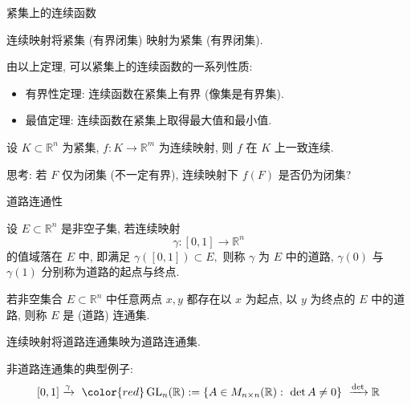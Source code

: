 \begin{frame}{紧集上的连续函数}

\begin{thm}
连续映射将紧集 (有界闭集) 映射为紧集 (有界闭集).
\end{thm}

\pause
\vspace{0.5em}

由以上定理, 可以紧集上的连续函数的一系列性质:
\begin{itemize}
\item 有界性定理: 连续函数在紧集上有界 (像集是有界集).
\item 最值定理: 连续函数在紧集上取得最大值和最小值.
\end{itemize}

\pause
\vspace{1.5em}

\begin{thm}
设 $K \subset \mathbb{R}^n$ 为紧集, $f: K \to \mathbb{R}^m$ 为连续映射, 则 $f$ 在 $K$ 上一致连续.
\end{thm}

\pause
\vspace{0.5em}

{\color{red}} 思考: 若 $F$ 仅为闭集 (不一定有界), 连续映射下 $f(F)$ 是否仍为闭集?

\end{frame}


\begin{frame}{道路连通性}

\begin{Def}[道路连通集]
设 $E \subset \mathbb{R}^n$ 是非空子集, 若连续映射
\[\gamma: [0, 1] \longrightarrow \mathbb{R}^n\]
的值域落在 $E$ 中, 即满足 $\gamma([0, 1]) \subset E,$ 则称 $\gamma$ 为 $E$ 中的道路, $\gamma(0)$ 与 $\gamma(1)$ 分别称为道路的起点与终点.

\pause
\vspace{0.5em}

若非空集合 $E \subset \mathbb{R}^n$ 中任意两点 $x, y$ 都存在以 $x$ 为起点, 以 $y$ 为终点的 $E$ 中的道路, 则称 $E$ 是 (道路) 连通集.
\end{Def}

\pause

\begin{thm}
连续映射将道路连通集映为道路连通集.
\end{thm}

\pause

非道路连通集的典型例子:
\[[0, 1] \xrightarrow{\gamma} ~ {\color{red} \operatorname{GL}_n(\mathbb{R}) := \{A \in M_{n\times n}(\mathbb{R}): ~ \det A \neq 0\} } ~ \xrightarrow{\det} \mathbb{R}\]

\end{frame}



